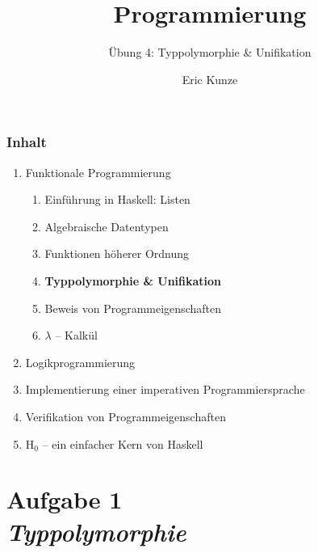 \documentclass{beamer}
\begin{document}
	
	\title{Programmierung}
	\subtitle{Übung 4: Typpolymorphie \& Unifikation}
	\author{Eric Kunze}
	\date{}
	
	\maketitle
	


\begin{frame}[fragile] \frametitle{Inhalt}
	\begin{enumerate}
		\item Funktionale Programmierung
		\begin{enumerate}
			\item Einführung in Haskell: Listen
			\item Algebraische Datentypen
			\item Funktionen höherer Ordnung
			\item \textbf{Typpolymorphie \& Unifikation}
			\item Beweis von Programmeigenschaften
			\item $\lambda$ -- Kalkül
		\end{enumerate}
		\item Logikprogrammierung
		\item Implementierung einer imperativen Programmiersprache
		\item Verifikation von Programmeigenschaften
		\item H${}_\text{0}$ -- ein einfacher Kern von Haskell
	\end{enumerate}
\end{frame}



\section{Aufgabe 1 \\ \textit{\normalsize Typpolymorphie}}
\end{document}
